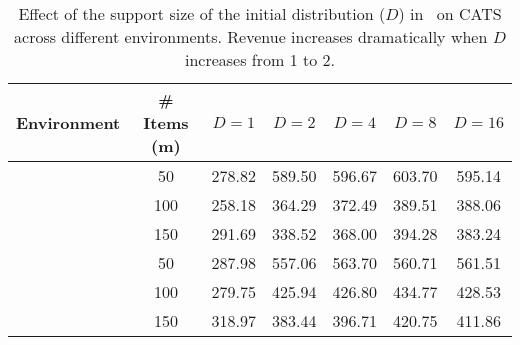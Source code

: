 \begin{table}[t]
    \caption{Effect of the support size of the initial distribution ($D$) in \name~on CATS across different environments. Revenue increases dramatically when $D$ increases from 1 to 2. \label{tab:D}}
    \centering
    \begin{tabular}{ccccccc}
        \toprule
        \textbf{Environment} & \textbf{\# Items (m)} & $D=1$ & $D=2$ & $D=4$ & $D=8$ & $D=16$ \\
        \midrule
        & 50  & 278.82 & 589.50 & 596.67 & 603.70 & 595.14\\
        & 100 & 258.18 & 364.29 & 372.49 & 389.51 & 388.06 \\
        & 150 & 291.69 & 338.52 & 368.00 & 394.28 & 383.24 \\
        \midrule
        & 50  & 287.98 & 557.06 & 563.70 & 560.71 & 561.51\\
        & 100 & 279.75 & 425.94 & 426.80 & 434.77 & 428.53  \\
        & 150 & 318.97 & 383.44 & 396.71 & 420.75 & 411.86\\
        \bottomrule
    \end{tabular}
\end{table}
%
